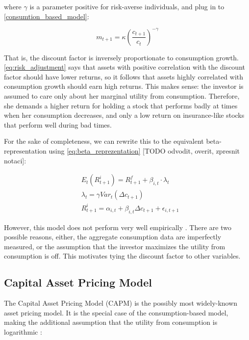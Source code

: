 		 	where $\gamma$ is a parameter positive for risk-averse individuals, and plug in to \ref{consumtion_based_model}: 
		 	
		 	\begin{equation}
		 	m_{t+1} = \kappa \left(\frac{c_{t+1}}{c_t}\right)^{-\gamma} 
		 	\end{equation}
		 	
		 	 That is, the discount factor is inversely proportionate to consumption growth. \ref{eq:risk_adjustment} says that assets with positive correlation with the discount factor should have lower returns, so it follows that assets highly correlated with consumption growth should earn high returns. This makes sense: the investor is assumed to care only about her marginal utility from consumption. Therefore, she demands a higher return for holding a stock that performs badly at times when her consumption decreases, and only a low return on insurance-like stocks that perform well during bad times.
		 	 
		 	 For the sake of completeness, we can rewrite this to the equivalent beta-representation using \ref{eq:beta_reprezentation} [TODO odvodit, overit, zpresnit notaci]: 
		 	 
		 	 \begin{align}
		 	 & E_t(R_{t+1}^i) = R_{t+1}^f + \beta_{i,t} \cdot \lambda_{t} \\
		 	 & \lambda_{t} = \gamma Var_t(\Delta c_{t+1}) \\
		 	 & R_{t+1}^i = \alpha_{i,t} + \beta_{i,t} \Delta c_{t+1} + \epsilon_{i,t+1}
		 	 \end{align}
		 	 
		 	  However, this model does not perform very well empirically \cite{cochrane1996cross}. There are two possible reasons, either, the aggregate consumption data are imperfectly measured, or the assumption that the investor maximizes the utility from consumption is off. This motivates tying the discount factor to other variables.
	 	
	 	\subsection{Capital Asset Pricing Model}
	 	
	 		The Capital Asset Pricing Model (CAPM) is the possibly most widely-known asset pricing model. It is the special case of the consumption-based model, making the additional assumption that the utility from consumption is logarithmic \citep{rubinstein1976valuation}:
	 		
